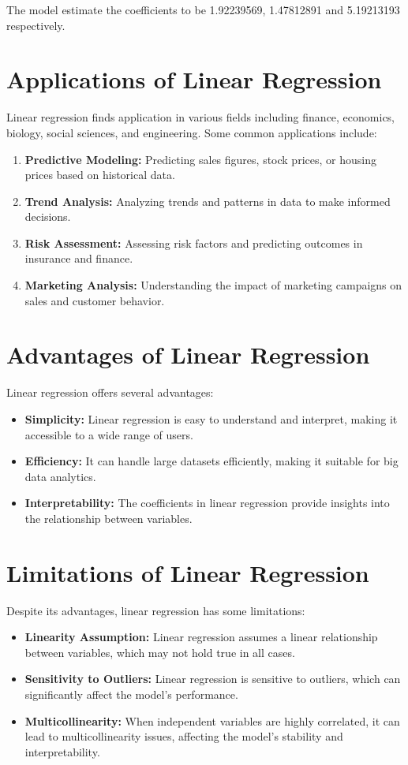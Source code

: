 \documentclass{article}
\begin{document}
The model estimate the coefficients to be 1.92239569, 1.47812891 and  5.19213193 respectively.

\section{Applications of Linear Regression}
Linear regression finds application in various fields including finance, economics, biology, social sciences, and engineering. Some common applications include:
\begin{enumerate}
    \item \textbf{Predictive Modeling:} Predicting sales figures, stock prices, or housing prices based on historical data.
    \item \textbf{Trend Analysis:} Analyzing trends and patterns in data to make informed decisions.
    \item \textbf{Risk Assessment:} Assessing risk factors and predicting outcomes in insurance and finance.
    \item \textbf{Marketing Analysis:} Understanding the impact of marketing campaigns on sales and customer behavior.
\end{enumerate}

\section{Advantages of Linear Regression}
Linear regression offers several advantages:
\begin{itemize}
    \item \textbf{Simplicity:} Linear regression is easy to understand and interpret, making it accessible to a wide range of users.
    \item \textbf{Efficiency:} It can handle large datasets efficiently, making it suitable for big data analytics.
    \item \textbf{Interpretability:} The coefficients in linear regression provide insights into the relationship between variables.
\end{itemize}

\section{Limitations of Linear Regression}
Despite its advantages, linear regression has some limitations:
\begin{itemize}
    \item \textbf{Linearity Assumption:} Linear regression assumes a linear relationship between variables, which may not hold true in all cases.
    \item \textbf{Sensitivity to Outliers:} Linear regression is sensitive to outliers, which can significantly affect the model's performance.
    \item \textbf{Multicollinearity:} When independent variables are highly correlated, it can lead to multicollinearity issues, affecting the model's stability and interpretability.
\end{itemize}
\end{document}
